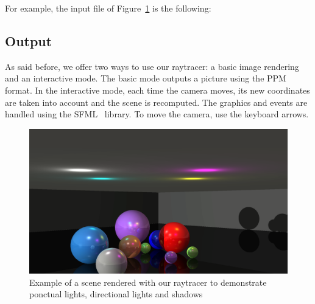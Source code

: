 \documentclass[a4paper,12pt,journal,twoside,compsoc]{PPIEEEtran}
\begin{document}
For example, the input file of Figure~\ref{Fig:shadow} is the following:\\
\noindent{}

\subsection{Output}
As said before, we offer two ways to use our raytracer: a basic image rendering and an interactive mode. The basic mode outputs a picture using the PPM~\cite{ppm} format. In the interactive mode, each time the camera moves, its new coordinates are taken into account and the scene is recomputed. The graphics and events are handled using the SFML~\cite{sfml} library. To move the camera, use the keyboard arrows.

\begin{figure}
\includegraphics[width=\linewidth]{corner.png}
\caption{Example of a scene rendered with our raytracer to demonstrate ponctual
  lights, directional lights and shadows}
\label{Fig:shadow}
\end{figure}

\end{document}
